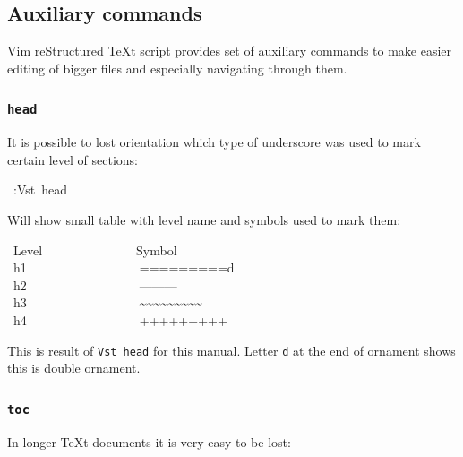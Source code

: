 \documentclass[12pt]{article}
\begin{document}
\subsection{Auxiliary commands}

Vim reStructured \TeX{}t script provides set of auxiliary commands to make easier editing
of bigger files and especially navigating through them.

\hypertarget{lheaders}{}

\hypertarget{l9696head9696}{}
\subsubsection{\texttt{head}}

It is possible to lost orientation which type of underscore was used to
mark certain level of sections:

\begin{ttfamily}\begin{flushleft}
\mbox{~:Vst~head}\\
\end{flushleft}\end{ttfamily}

Will show small table with level name and symbols used to mark them:

\begin{ttfamily}\begin{flushleft}
\mbox{~Level~~~~~~~~~~~~~~~Symbol}\\
\mbox{~h1~~~~~~~~~~~~~~~~~~=========d}\\
\mbox{~h2~~~~~~~~~~~~~~~~~~---------~}\\
\mbox{~h3~~~~~~~~~~~~~~~~~~\~{}\~{}\~{}\~{}\~{}\~{}\~{}\~{}\~{}~}\\
\mbox{~h4~~~~~~~~~~~~~~~~~~+++++++++}\\
\end{flushleft}\end{ttfamily}

This is result of \texttt{Vst head} for this manual. Letter \texttt{d} at the end of
ornament shows this is double ornament.

\hypertarget{lcontents}{}

\hypertarget{l9696toc9696}{}
\subsubsection{\texttt{toc}}

In longer \TeX{}t documents it is very easy to be lost:
\end{document}
